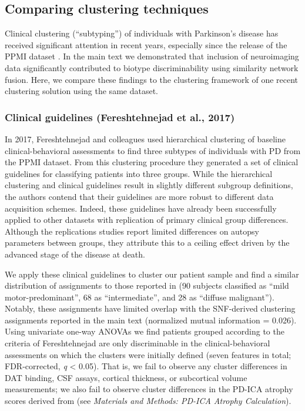 \documentclass[12pt,aps,pra,reprint,showkeys]{revtex4-1}
\begin{document}
\subsection*{Comparing clustering techniques}

Clinical clustering (``subtyping'') of individuals with Parkinson's disease has received significant attention in recent years, especially since the release of the PPMI dataset \citep{faghri2018predicting, fereshtehnejad2017clinical}.
In the main text we demonstrated that inclusion of neuroimaging data significantly contributed to biotype discriminability using similarity network fusion.
Here, we compare these findings to the clustering framework of one recent clustering solution using the same dataset.

\subsubsection*{Clinical guidelines (Fereshtehnejad et al., 2017)}

In 2017, Fereshtehnejad and colleagues \citep{fereshtehnejad2017clinical} used hierarchical clustering of baseline clinical-behavioral assessments to find three subtypes of individuals with PD from the PPMI dataset.
From this clustering procedure they generated a set of clinical guidelines for classifying patients into three groups.
While the hierarchical clustering and clinical guidelines result in slightly different subgroup definitions, the authors contend that their guidelines are more robust to different data acquisition schemes.
Indeed, these guidelines have already been successfully applied to other datasets \citep{de2019prognosis} with replication of primary clinical group differences.
Although the replications studies report  limited differences on autopsy parameters between groups, they attribute this to a ceiling effect driven by the advanced stage of the disease at death.

We apply these clinical guidelines to cluster our patient sample and find a similar distribution of assignments to those reported in \citep{fereshtehnejad2017clinical} (90 subjects classified as ``mild motor-predominant'', 68 as ``intermediate'', and 28 as ``diffuse malignant'').
Notably, these assignments have limited overlap with the SNF-derived clustering assignments reported in the main text (normalized mutual information = 0.026).
Using univariate one-way ANOVAs we find patients grouped according to the criteria of Fereshtehnejad are only discriminable in the clinical-behavioral assessments on which the clusters were initially defined (seven features in total; FDR-corrected, \emph{q} < 0.05).
That is, we fail to observe any cluster differences in DAT binding, CSF assays, cortical thickness, or subcortical volume measurements; we also fail to observe cluster differences in the PD-ICA atrophy scores derived from \citep{zeighami2015network} (see \textit{Materials and Methods: PD-ICA Atrophy Calculation}).
\end{document}
